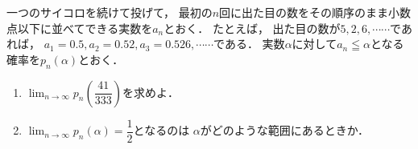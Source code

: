 \documentclass[../../main.tex]{subfiles}
\begin{document}
一つのサイコロを続けて投げて，
最初の$n$回に出た目の数をその順序のまま小数点以下に並べてできる実数を$a_n$とおく．
たとえば，
出た目の数が$5,2,6,\cdots\cdots$であれば，
$a_1=0.5,a_2=0.52,a_3=0.526,\cdots\cdots$である．
実数$\alpha$に対して$a_n\leqq\alpha$となる確率を$p_n(\alpha)$とおく．
\begin{enumerate}
  \item $\displaystyle\lim_{n\to\infty}p_n \left( \dfrac{41}{333} \right)$を求めよ．
  \item $\displaystyle\lim_{n\to\infty}p_n(\alpha)=\dfrac{1}{2}$となるのは
    $\alpha$がどのような範囲にあるときか．
\end{enumerate}
\end{document}
